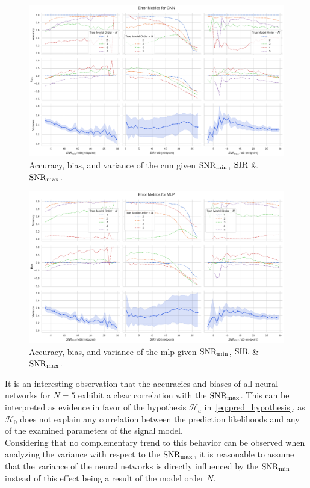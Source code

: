 \begin{figure}[H]
    \centering
    \includegraphics[width=\textwidth]{figures/07_Evaluation/snr_sir/cnn_3x3.png}
    \caption{Accuracy, bias, and variance of the \gls{cnn} given \( \mathrm{SNR}_{\min} \), \( \mathrm{SIR} \) \& \( \mathrm{SNR}_{\max} \).}
    \label{fig:eval_grids/cnn}
\end{figure}
\begin{figure}[H]
    \centering
    \includegraphics[width=\textwidth]{figures/07_Evaluation/snr_sir/mlp_3x3.png}
    \caption{Accuracy, bias, and variance of the \gls{mlp} given \( \mathrm{SNR}_{\min} \), \( \mathrm{SIR} \) \& \( \mathrm{SNR}_{\max} \).}
    \label{fig:eval_grids/mlp}
\end{figure}

It is an interesting observation that the accuracies and biases of all neural networks for \( N = 5 \) exhibit a
clear correlation with the \( \mathrm{SNR}_{\max} \). This can be interpreted as evidence in favor of the hypothesis
\( \mathcal{H}_a \) in~\autoref{eq:pred_hypothesis}, as \( \mathcal{H}_0 \) does not explain any correlation between
the prediction likelihoods and any of the examined parameters of the signal model. \\
Considering that no complementary trend to this behavior can be observed when analyzing the variance with respect to the
\( \mathrm{SNR}_{\max} \), it is reasonable to assume that the variance of the neural networks is directly influenced by the
\( \mathrm{SNR}_{\min} \) instead of this effect being a result of the model order \( N \).

